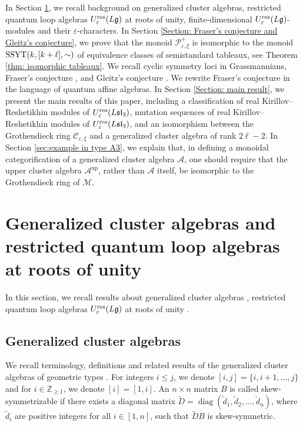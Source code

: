 \documentclass[11pt, reqno]{amsart}
\theoremstyle{plain}
\theoremstyle{definition}
\numberwithin{equation}{section}
\newcommand{\ZZ}{{\mathbb {Z}}}
\newcommand{\res}{{\rm res}}
\DeclareMathOperator*{\diag}{diag}
\begin{document}
In Section \ref{Section: Generalized cluster algebras and representations of restricted quantum affine algebras at roots of unity}, we recall background on generalized cluster algebras, restricted quantum loop algebras $U_\varepsilon^{\res}({L\mathfrak{g}})$ at roots of unity, finite-dimensional $U_\varepsilon^{\res}({L\mathfrak{g}})$-modules and their $\varepsilon$-characters. In Section \ref{Section: Fraser's conjecture and Gleitz's conjecture}, we prove that the monoid $\mathcal{P}^+_{\varepsilon, \xi}$ is isomorphic to the monoid ${\rm SSYT}(k, [k+\ell], \sim)$ of equivalence classes of semistandard tableaux, see Theorem \ref{thm: isomorphic tableaux}. We recall cyclic symmetry loci in Grassmannians, Fraser's conjecture \cite{Fra20}, and Gleitz's conjecture \cite{Gle16}. We rewrite Fraser's conjecture in the language of quantum affine algebras. In Section \ref{Section: main result}, we present the main results of this paper, including a classification of real Kirillov--Reshetikhin modules of $U_\varepsilon^{\res}(L\mathfrak{sl}_3)$, mutation sequences of real Kirillov--Reshetikhin modules of $U_\varepsilon^\res({L\mathfrak{sl}_{3}})$, and an isomorphism between the Grothendieck ring $\mathcal{C}_{\varepsilon, \xi}$ and a generalized cluster algebra of rank $2 \ell-2$. In Section \ref{sec:example in type A3}, we explain that, in defining a monoidal categorification of a generalized cluster algebra $\mathcal{A}$, one should require that the upper cluster algebra $\mathcal{A}^{\mathrm{up}}$, rather than $\mathcal{A}$ itself, be isomorphic to the Grothendieck ring of $\mathcal{M}$.


\section{Generalized cluster algebras and restricted quantum loop algebras at roots of unity}\label{Section: Generalized cluster algebras and representations of restricted quantum affine algebras at roots of unity}
 In this section, we recall results about generalized cluster algebras \cite{BCDX20, CS14}, restricted quantum loop algebras $U_\varepsilon^{\res}({L\mathfrak{g}})$ at roots of unity \cite{CP97, FM02}. 
 \subsection{Generalized cluster algebras}
 We recall terminology, definitions and related results of the generalized cluster algebras of geometric types \cite{BCDX20}.
 For integers $i \le j$, we denote $[i,j] = \{i,i+1,\ldots,j\}$ and for $i \in \ZZ_{\ge 1}$, we denote $[i] = [1,i]$. An $n\times n$ matrix $B$ is called skew-symmetrizable if there exists a diagonal matrix $\widetilde{D}=\diag (\widetilde{d}_1, \widetilde{d}_2, \ldots, \widetilde{d}_n )$, where $\widetilde{d}_i$ are positive integers for all $i\in [1,n]$, such that $\widetilde{D}B$ is skew-symmetric.
\end{document}
